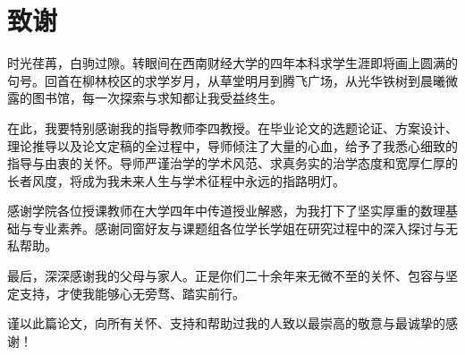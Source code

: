 

\ifswufereview
\else
  \chapter*{致\quad 谢}

  时光荏苒，白驹过隙。转眼间在西南财经大学的四年本科求学生涯即将画上圆满的句号。回首在柳林校区的求学岁月，从草堂明月到腾飞广场，从光华铁树到晨曦微露的图书馆，每一次探索与求知都让我受益终生。

  在此，我要特别感谢我的指导教师李四教授。在毕业论文的选题论证、方案设计、理论推导以及论文定稿的全过程中，导师倾注了大量的心血，给予了我悉心细致的指导与由衷的关怀。导师严谨治学的学术风范、求真务实的治学态度和宽厚仁厚的长者风度，将成为我未来人生与学术征程中永远的指路明灯。

  感谢学院各位授课教师在大学四年中传道授业解惑，为我打下了坚实厚重的数理基础与专业素养。感谢同窗好友与课题组各位学长学姐在研究过程中的深入探讨与无私帮助。

  最后，深深感谢我的父母与家人。正是你们二十余年来无微不至的关怀、包容与坚定支持，才使我能够心无旁骛、踏实前行。

  谨以此篇论文，向所有关怀、支持和帮助过我的人致以最崇高的敬意与最诚挚的感谢！
\fi
